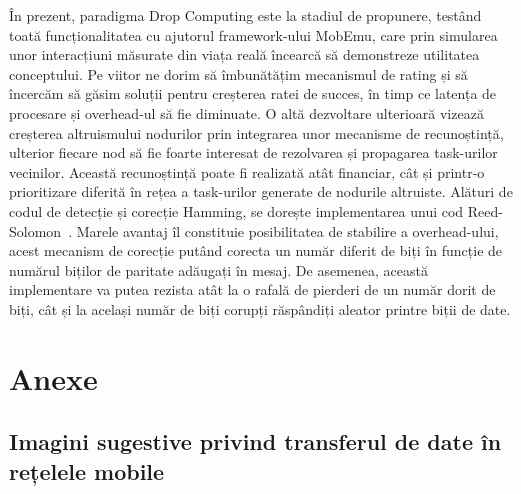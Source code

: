 \documentclass[12pt,a4paper]{report}
\begin{document}
În prezent, paradigma Drop Computing este la stadiul de propunere, testând toată funcționalitatea cu ajutorul framework-ului MobEmu, care prin simularea unor interacțiuni măsurate din viața reală încearcă să demonstreze utilitatea conceptului. Pe viitor ne dorim să îmbunătățim mecanismul de rating și să încercăm să găsim soluții pentru creșterea ratei de succes, în timp ce latența de procesare și overhead-ul să fie diminuate. O altă dezvoltare ulterioară vizează creșterea altruismului nodurilor prin integrarea unor mecanisme de recunoștință, ulterior fiecare nod să fie foarte interesat de rezolvarea și propagarea task-urilor vecinilor. Această recunoștință poate fi realizată atât financiar, cât și printr-o prioritizare diferită în rețea a task-urilor generate de nodurile altruiste.
Alături de codul de detecție și corecție Hamming, se dorește implementarea unui cod Reed-Solomon~\cite{reedSolomon}. Marele avantaj îl constituie posibilitatea de stabilire a overhead-ului, acest mecanism de corecție putând corecta un număr diferit de biți în funcție de numărul biților de paritate adăugați în mesaj. De asemenea, această implementare va putea rezista atât la o rafală de pierderi de un număr dorit de biți, cât și la același număr de biți corupți răspândiți aleator printre biții de date.






\chapter{Anexe} \label{anexe}
\newlength\someheight
\setlength\someheight{3cm}
 
\section{Imagini sugestive privind transferul de date în rețelele mobile}  \label{imagini}
\end{document}
